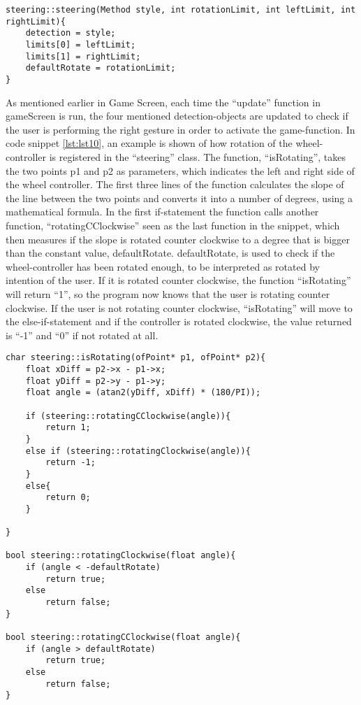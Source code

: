 \begin{lstlisting}[caption=steering constructor, label=lst:lst9]
steering::steering(Method style, int rotationLimit, int leftLimit, int rightLimit){
    detection = style;
    limits[0] = leftLimit;
    limits[1] = rightLimit;
    defaultRotate = rotationLimit;
}
\end{lstlisting}

As mentioned earlier in Game Screen, each time the “update” function in gameScreen is run, the four mentioned detection-objects are updated to check if the user is performing the right gesture in order to activate the game-function. 
In code snippet \ref{lst:lst10}, an example is shown of how rotation of the wheel-controller is registered in the “steering” class.
The function, “isRotating”, takes the two points p1 and p2 as parameters, which indicates the left and right side of the wheel controller. 
The first three lines of the function calculates the slope of the line between the two points and converts it into a number of degrees, using a mathematical formula. 
In the first if-statement the function calls another function, “rotatingCClockwise” seen as the last function in the snippet, which then measures if the slope is rotated counter clockwise to a degree that is bigger than the constant value, defaultRotate. 
defaultRotate, is used to check if the wheel-controller has been rotated enough, to be interpreted as rotated by intention of the user. 
If it is rotated counter clockwise, the function “isRotating” will return “1”, so the program now knows that the user is rotating counter clockwise. 
If the user is not rotating counter clockwise, “isRotating” will move to the else-if-statement and if the controller is rotated clockwise, the value returned is “-1” and “0” if not rotated at all.

\pagebreak[4]

\begin{lstlisting}[caption=update, label=lst:lst10]
char steering::isRotating(ofPoint* p1, ofPoint* p2){
	float xDiff = p2->x - p1->x;
	float yDiff = p2->y - p1->y;
	float angle = (atan2(yDiff, xDiff) * (180/PI));

	if (steering::rotatingCClockwise(angle)){
		return 1;
	}
	else if (steering::rotatingClockwise(angle)){
		return -1;
	}
	else{
		return 0;
	}

}

bool steering::rotatingClockwise(float angle){
	if (angle < -defaultRotate)
		return true;
	else
		return false;
}

bool steering::rotatingCClockwise(float angle){
	if (angle > defaultRotate)
		return true;
	else
		return false;
}
\end{lstlisting}

